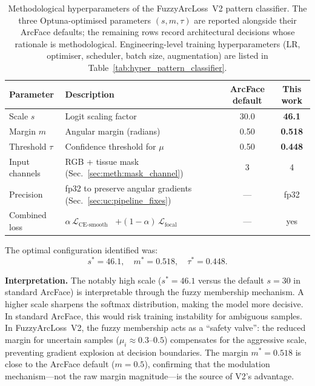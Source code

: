 \begin{table}[ht!]
\centering
\small
\caption{Methodological hyperparameters of the FuzzyArcLoss~V2
pattern classifier.
The three Optuna-optimised parameters $(s, m, \tau)$ are reported
alongside their ArcFace defaults; the remaining rows record
architectural decisions whose rationale is methodological.
Engineering-level training hyperparameters (LR, optimiser, scheduler,
batch size, augmentation) are listed in
Table~\ref{tab:hyper_pattern_classifier}.}
\label{tab:hyper_fuzzyarc2}
\begin{tabular}{l l c c}
\hline
\textbf{Parameter} & \textbf{Description} &
\textbf{ArcFace default} & \textbf{This work} \\
\hline
Scale $s$               & Logit scaling factor~\cite{deng2019arcface}                       & 30.0 & \textbf{46.1} \\
Margin $m$              & Angular margin (radians)~\cite{deng2019arcface}                   & 0.50 & \textbf{0.518} \\
Threshold $\tau$        & Confidence threshold for $\mu$~\cite{lima2025fuzzy}               & 0.50 & \textbf{0.448} \\
Input channels          & RGB + tissue mask (Sec.~\ref{sec:meth:mask_channel})              & 3    & 4 \\
Precision               & fp32 to preserve angular gradients (Sec.~\ref{sec:uc:pipeline_fixes}) & --- & fp32 \\
Combined loss           & $\alpha\,\mathcal{L}_{\text{CE-smooth}}$~\cite{szegedy2016rethinking} $+ (1-\alpha)\,\mathcal{L}_{\text{focal}}$~\cite{lin2017focal} & --- & yes \\
\hline
\end{tabular}
\end{table}


The optimal configuration identified was:
\begin{equation}
\label{eq:optuna_result}
s^* = 46.1, \quad m^* = 0.518, \quad \tau^* = 0.448.
\end{equation}

\textbf{Interpretation.}
The notably high scale ($s^* = 46.1$ versus the default $s = 30$ in standard ArcFace) is interpretable through the fuzzy membership mechanism.
A higher scale sharpens the softmax distribution, making the model more decisive.
In standard ArcFace, this would risk training instability for ambiguous samples.
In FuzzyArcLoss~V2, the fuzzy membership acts as a ``safety valve'': the reduced margin for uncertain samples ($\mu_i \approx 0.3$--$0.5$) compensates for the aggressive scale, preventing gradient explosion at decision boundaries.
The margin $m^* = 0.518$ is close to the ArcFace default ($m = 0.5$), confirming that the modulation mechanism---not the raw margin magnitude---is the source of V2's advantage.

